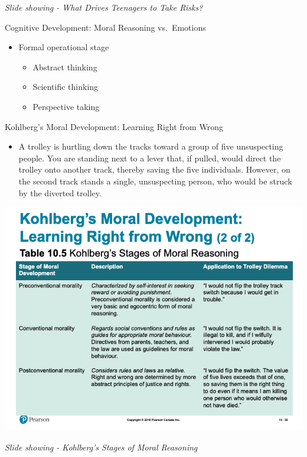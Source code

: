 \documentclass[
]{book}
\providecommand{\tightlist}{%
  \setlength{\itemsep}{0pt}\setlength{\parskip}{0pt}}
\begin{document}
\begin{reflect}
\emph{Slide showing - What Drives Teenagers to Take Risks?}

Cognitive Development: Moral Reasoning vs.~Emotions

\begin{itemize}
\tightlist
\item
  Formal operational stage

  \begin{itemize}
  \tightlist
  \item
    Abstract thinking\\
  \item
    Scientific thinking\\
  \item
    Perspective taking
  \end{itemize}
\end{itemize}

Kohlberg's Moral Development: Learning Right from Wrong

\begin{itemize}
\tightlist
\item
  A trolley is hurtling down the tracks toward a group of five unsuspecting people. You are standing next to a lever that, if pulled, would direct the trolley onto another track, thereby saving the five individuals. However, on the second track stands a single, unsuspecting person, who would be struck by the diverted trolley.
\end{itemize}

\includegraphics{assets/unit_3/slide_50.png}

\emph{Slide showing - Kohlberg's Stages of Moral Reasoning}


\end{reflect}
\end{document}
